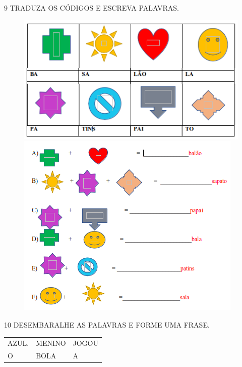 

\num{9} TRADUZA OS CÓDIGOS E ESCREVA PALAVRAS.

\begin{figure}[htpb!]
\includegraphics[width=\textwidth]{media/flag1.png}

\includegraphics[width=\textwidth]{media/flag2.png}
\end{figure}


\num{10} DESEMBARALHE AS PALAVRAS E FORME UMA FRASE.

\begin{longtable}[]{@{}lll@{}}
\toprule
AZUL. & MENINO & JOGOU\tabularnewline
O & BOLA & A\tabularnewline
\bottomrule
\end{longtable}

